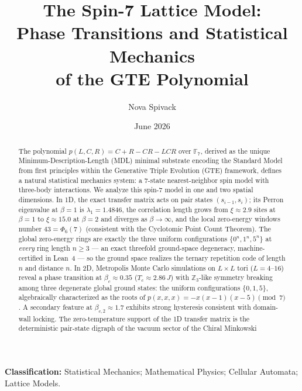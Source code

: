 \documentclass[11pt]{article}
\theoremstyle{remark}
\begin{document}
\title{\textbf{The Spin-7 Lattice Model:\\
Phase Transitions and Statistical Mechanics\\
of the GTE Polynomial}}

\author{Nova Spivack}
\date{June 2026}
\maketitle

\NovaZenodoAfterTitle

\noindent\textbf{Classification:} Statistical Mechanics; Mathematical Physics;
Cellular Automata; Lattice Models.

\begin{abstract}
The polynomial $p(L,C,R) = C + R - CR - LCR$ over $\mathbb{F}_7$, derived as
the unique Minimum-Description-Length (MDL) minimal substrate encoding the
Standard Model from first principles within the Generative Triple Evolution
(GTE) framework,
defines a natural statistical mechanics system: a 7-state nearest-neighbor spin
model with three-body interactions. We analyze this spin-7 model in one and two
spatial dimensions. In 1D, the exact transfer matrix acts on pair states
$(s_{i-1}, s_i)$; its Perron eigenvalue at $\beta = 1$ is $\lambda_1 = 1.4846$,
the correlation length grows from $\xi \approx 2.9$ sites at $\beta = 1$ to
$\xi \approx 15.0$ at $\beta = 2$ and diverges as $\beta \to \infty$, and the
local zero-energy windows number $43 = \Phi_6(7)$ (consistent with the
Cyclotomic Point Count Theorem). The global zero-energy rings are exactly the
three uniform configurations $\{0^n, 1^n, 5^n\}$ at \emph{every} ring length
$n \ge 3$ --- an exact threefold ground-space degeneracy, machine-certified in
Lean~4 --- so the ground space realizes the ternary repetition code of length
$n$ and distance $n$. In 2D,
Metropolis Monte Carlo simulations on $L \times L$ tori ($L = 4$--$16$) reveal
a phase transition at $\beta_c \approx 0.35$ ($T_c \approx 2.86\,J$) with
$\mathbb{Z}_3$-like symmetry breaking among three degenerate global ground
states: the uniform configurations $\{0, 1, 5\}$, algebraically characterized
as the roots of $p(x,x,x) = -x(x-1)(x-5) \pmod 7$. A secondary feature at
$\beta_{c,2} \approx 1.7$ exhibits strong hysteresis consistent with domain-wall
locking. The zero-temperature support of the 1D transfer matrix is the
deterministic pair-state digraph of the vacuum sector of the Chiral Minkowski

\end{abstract}
\end{document}

